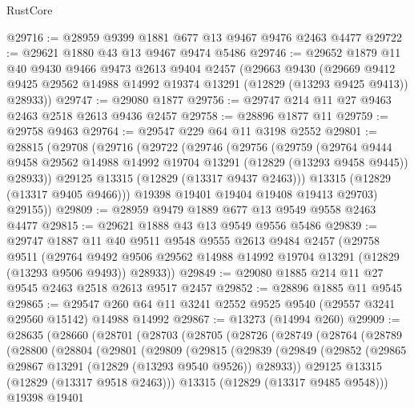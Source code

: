 \begin{lexlean}{RustCore}
\begin{coremodule}
@29716 := @28959 @9399 @1881 @677 @13 @9467 @9476 @2463 @4477
@29722 := @29621 @1880 @43 @13 @9467 @9474 @5486
@29746 := @29652
    @1879
    @11
    @40
    @9430
    @9466
    @9473
    @2613
    @9404
    @2457
    (@29663
      @9430
      (@29669 @9412 @9425 @29562 @14988 @14992 @19374 @13291 (@12829 (@13293 @9425 @9413)) @28933))
@29747 := @29080 @1877
@29756 := @29747 @214 @11 @27 @9463 @2463 @2518 @2613 @9436 @2457
@29758 := @28896 @1877 @11
@29759 := @29758 @9463
@29764 := @29547 @229 @64 @11 @3198 @2552
@29801 := @28815
    (@29708
      (@29716
        (@29722
          (@29746
            (@29756
              (@29759
                (@29764
                  @9444
                  @9458
                  @29562
                  @14988
                  @14992
                  @19704
                  @13291
                  (@12829 (@13293 @9458 @9445))
                  @28933))
              @29125
              @13315
              (@12829 (@13317 @9437 @2463)))
            @13315
            (@12829 (@13317 @9405 @9466)))
          @19398
          @19401
          @19404
          @19408
          @19413
          @29703)
        @29155))
@29809 := @28959 @9479 @1889 @677 @13 @9549 @9558 @2463 @4477
@29815 := @29621 @1888 @43 @13 @9549 @9556 @5486
@29839 := @29747
    @1887
    @11
    @40
    @9511
    @9548
    @9555
    @2613
    @9484
    @2457
    (@29758
      @9511
      (@29764 @9492 @9506 @29562 @14988 @14992 @19704 @13291 (@12829 (@13293 @9506 @9493)) @28933))
@29849 := @29080 @1885 @214 @11 @27 @9545 @2463 @2518 @2613 @9517 @2457
@29852 := @28896 @1885 @11 @9545
@29865 := @29547 @260 @64 @11 @3241 @2552 @9525 @9540 (@29557 @3241 @29560 @15142) @14988 @14992
@29867 := @13273 (@14994 @260)
@29909 := @28635
    (@28660
      (@28701
        (@28703
          (@28705
            (@28726
              (@28749
                (@28764
                  (@28789
                    (@28800
                      (@28804
                        (@29801
                          (@29809
                            (@29815
                              (@29839
                                (@29849
                                  (@29852
                                    (@29865 @29867 @13291 (@12829 (@13293 @9540 @9526)) @28933))
                                  @29125
                                  @13315
                                  (@12829 (@13317 @9518 @2463)))
                                @13315
                                (@12829 (@13317 @9485 @9548)))
                              @19398
                              @19401

\end{coremodule}
\end{lexlean}
